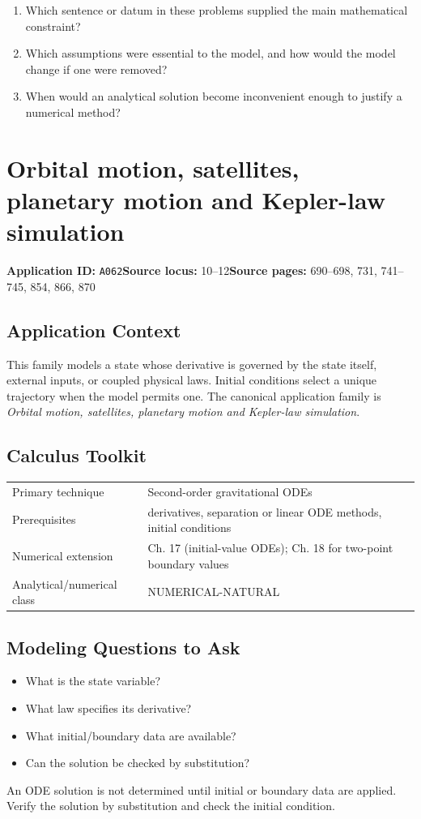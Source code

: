 \documentclass[11pt]{book}
\newcommand{\pid}[1]{\texttt{#1}}
\begin{document}
\begin{reflectionbox}\begin{enumerate}
\item Which sentence or datum in these problems supplied the main mathematical constraint?
\item Which assumptions were essential to the model, and how would the model change if one were removed?
\item When would an analytical solution become inconvenient enough to justify a numerical method?
\end{enumerate}\end{reflectionbox}
\chapter{Orbital motion, satellites, planetary motion and Kepler-law simulation}\label{app:A062}
\textbf{Application ID:} \pid{A062}\quad \textbf{Source locus:} 10–12\quad \textbf{Source pages:} 690–698, 731, 741–745, 854, 866, 870
\section*{Application Context}
This family models a state whose derivative is governed by the state itself, external inputs, or coupled physical laws. Initial conditions select a unique trajectory when the model permits one. The canonical application family is \emph{Orbital motion, satellites, planetary motion and Kepler-law simulation}.
\section*{Calculus Toolkit}
\begin{tabularx}{\textwidth}{@{}lX@{}}\toprule
Primary technique & Second-order gravitational ODEs \\
Prerequisites & derivatives, separation or linear ODE methods, initial conditions \\
Numerical extension & Ch. 17 (initial-value ODEs); Ch. 18 for two-point boundary values \\
Analytical/numerical class & NUMERICAL-NATURAL \\
\bottomrule\end{tabularx}
\section*{Modeling Questions to Ask}\begin{itemize}
\item What is the state variable?
\item What law specifies its derivative?
\item What initial/boundary data are available?
\item Can the solution be checked by substitution?
\end{itemize}
\begin{errorbox}An ODE solution is not determined until initial or boundary data are applied. Verify the solution by substitution and check the initial condition.\end{errorbox}
\end{document}

